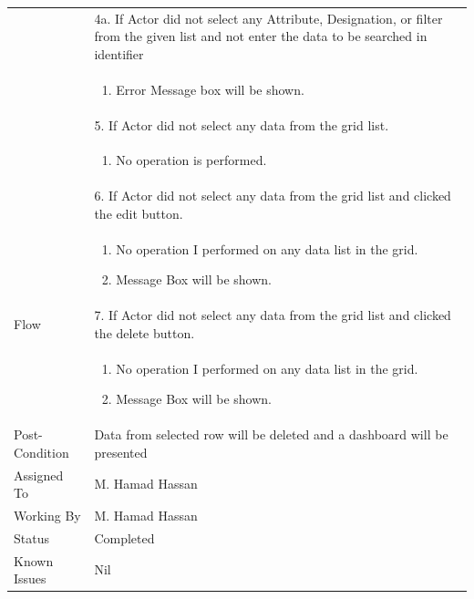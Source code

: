 \documentclass[12pt,a4paper]{article}
\begin{document}
\begin{longtable}{| p{3cm}|p{12cm}|}
& 4a. If Actor did not select any Attribute, Designation, or filter from the given list and not enter the data to be searched in identifier \\
& \begin{enumerate}
		\item Error Message box will be shown.
	\end{enumerate}
\\  
& 5. If Actor did not select any data from the grid list.  \\
& \begin{enumerate}
		\item No operation is performed.
	\end{enumerate}
\\ 
& 6. If Actor did not select any data from the grid list and clicked the edit button.\\
& \begin{enumerate}
		\item No operation I performed on any data list in the grid.
            \item Message Box will be shown.
	\end{enumerate}
\\
Flow       & 7. If Actor did not select any data from the grid list and clicked the delete button.\\
 	&\begin{enumerate}
			\item No operation I performed on any data list in the grid.
            \item Message Box will be shown.
	\end{enumerate}
\\ \hline 


Post-Condition &  Data from selected row will be deleted and a dashboard will be presented  \\ \hline
Assigned To &  M. Hamad Hassan
\\ \hline
Working By &    M. Hamad Hassan
\\ \hline
Status & 	Completed	
\\ \hline
Known Issues & Nil
\\\hline
\end{longtable}

\end{document}
